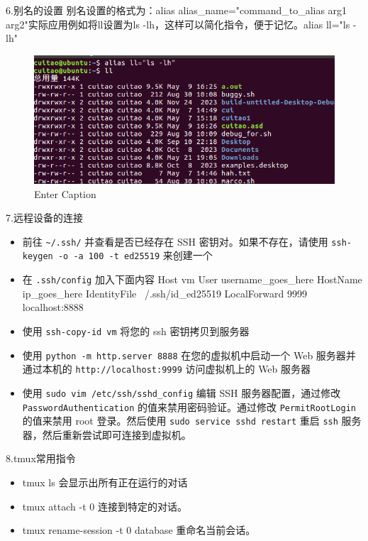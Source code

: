 \documentclass{article}
\begin{document}
6.别名的设置
  别名设置的格式为：alias alias\_name="command\_to\_alias arg1 arg2"实际应用例如将ll设置为ls -lh，这样可以简化指令，便于记忆。alias ll="ls -lh"\newline
\begin{figure}
    \centering
    \includegraphics[width=0.5\linewidth]{别名.png}
    \caption{Enter Caption}
    \label{fig:设置别名}
\end{figure}
7.远程设备的连接
\begin{itemize}
    \item 前往 \verb|~/.ssh/| 并查看是否已经存在 SSH 密钥对。如果不存在，请使用 \verb|ssh-keygen -o -a 100 -t ed25519| 来创建一个 
    \item 在 \verb|.ssh/config| 加入下面内容\newline
 Host vm\newline
    User username\_goes\_here\newline
    HostName ip\_goes\_here\newline
    IdentityFile ~/.ssh/id\_ed25519\newline
    LocalForward 9999 localhost:8888\newline
    \item 使用 \verb|ssh-copy-id vm| 将您的 ssh 密钥拷贝到服务器
    \item  使用 \verb|python -m http.server 8888| 在您的虚拟机中启动一个 Web 服务器并通过本机的 \verb|http://localhost:9999| 访问虚拟机上的 Web 服务器
    \item 使用 \verb|sudo vim /etc/ssh/sshd_config| 编辑 SSH 服务器配置，通过修改 \verb|PasswordAuthentication| 的值来禁用密码验证。通过修改 \verb|PermitRootLogin| 的值来禁用 root 登录。然后使用 \verb|sudo service sshd restart| 重启 \verb|ssh| 服务器，然后重新尝试即可连接到虚拟机。
 
\end{itemize}
\newline
8.tmux常用指令
\begin{itemize}
\item tmux ls 会显示出所有正在运行的对话
\item tmux attach -t 0 连接到特定的对话。
\item tmux rename-session -t 0 database 重命名当前会话。
\end{itemize}
\end{document}

